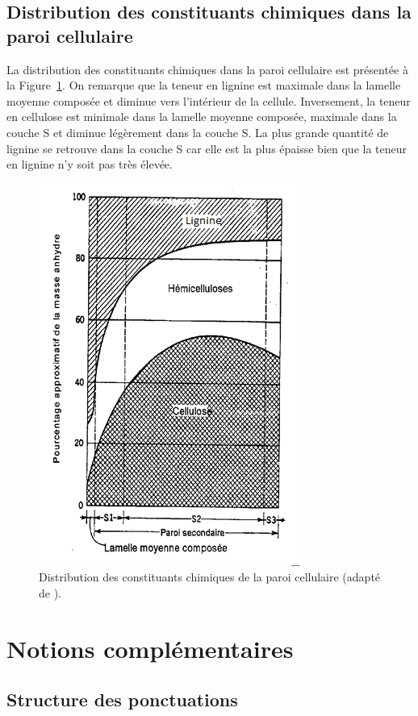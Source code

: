 \subsection{Distribution des constituants chimiques dans la paroi cellulaire}

La distribution des constituants chimiques dans la paroi cellulaire est présentée à la Figure~\ref{fig:prop}. On remarque que la teneur en lignine est maximale dans la lamelle moyenne composée et diminue vers l'intérieur de la cellule. Inversement, la teneur en cellulose est minimale dans la lamelle moyenne composée, maximale dans la couche S et diminue légèrement dans la couche S. La plus grande quantité de lignine se retrouve dans la couche S car elle est la plus épaisse bien que la teneur en lignine n'y soit pas très élevée.

\begin{figure}[h]
\centering
\includegraphics[scale=0.7]{img/ch6_prop}
\caption{Distribution des constituants chimiques de la paroi cellulaire (adapté de \cite{panshin1980textbook}).}
\label{fig:prop}
\end{figure}

\section{Notions complémentaires}

\subsection{Structure des ponctuations}


